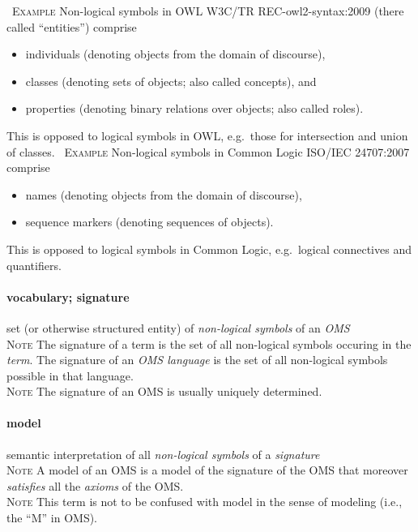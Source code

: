 \documentclass[10pt,%
\ifpretendfinal
final%
\else
draft%
\fi,
]{scrreprt}
\newcommand*{\termref}[1]{\textit{#1}}
\newcommand*{\synonym}{; }
\newcommand{\termdefinition}[2]{\paragraph{#1} #2}
\newcommand{\nisref}[1]{#1}
\newenvironment{definitions}[0]{\medskip }{}
\newenvironment{note}[0]{\ \\ \textsc{Note} \quad}{}
\newenvironment{example}[0]{\ \newline \textsc{Example}\quad }{}
\begin{document}
\begin{definitions}
  \begin{example}
    Non-logical symbols in OWL \nisref{W3C/TR REC-owl2-syntax:2009} (there called ``entities'') comprise
    \begin{itemize}
    \item individuals (denoting objects from the domain of discourse),
    \item classes (denoting sets of objects; also called concepts), and
    \item properties (denoting binary relations over objects; also called
      roles).
    \end{itemize}
    This is opposed to logical symbols in OWL, e.g.\ those for intersection
    and union of classes.
  \end{example}
  \begin{example}
    Non-logical symbols in Common Logic \nisref{ISO/IEC 24707:2007} comprise
    \begin{itemize}
    \item names (denoting objects from the domain of discourse),
    \item sequence markers (denoting sequences of objects).
    \end{itemize}
    This is opposed to logical symbols in Common Logic, e.g.\ logical connectives and
    quantifiers.
  \end{example}


\termdefinition{vocabulary\synonym signature}{set (or otherwise
  structured entity) of \termref{non-logical symbols} of an
  \termref{OMS}}
   \begin{note}
     The signature of a term is the set of all non-logical symbols occuring
     in the \termref{term}. The signature of an \termref{OMS language} is the
     set of all non-logical symbols possible in that language.     
   \end{note}
   \begin{note}
    The signature of an OMS is usually uniquely determined.
   \end{note}
  \termdefinition{model}{semantic interpretation of all \termref{non-logical symbols} of a \termref{signature}}
  \begin{note}
    A model of an OMS is a model of the signature of the OMS
    that moreover \termref{satisfies} all the \termref{axioms} of the OMS.
  \end{note}
  \begin{note}
  This term is not to be confused with model in the sense of modeling (i.e.,
  the ``M'' in OMS).
  \end{note}


\end{definitions}
\end{document}
